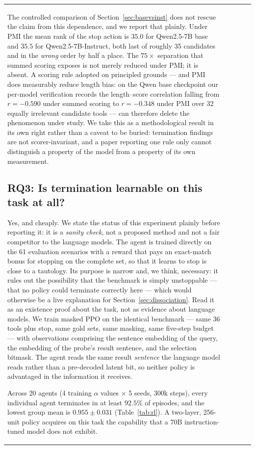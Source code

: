\documentclass[11pt]{article}
\begin{document}
\begin{table}[t]
\begin{tabular}{lcccc}
The controlled comparison of Section~\ref{sec:basevsinst} does not rescue the
claim from this dependence, and we report that plainly. Under PMI the mean rank of
the stop action is $35.0$ for Qwen2.5-7B base and $35.5$ for Qwen2.5-7B-Instruct,
both last of roughly 35 candidates and in the \emph{wrong} order by half a place.
The $75\times$ separation that summed scoring exposes is not merely reduced under
PMI; it is absent. A scoring rule adopted on principled grounds --- and PMI does
measurably reduce length bias: on the Qwen base checkpoint our per-model
verification records the length--score correlation falling from $r=-0.590$ under
summed scoring to $r=-0.348$ under PMI over 32 equally irrelevant candidate tools
--- can therefore delete the phenomenon under study. We take this as a methodological result in its own right rather than
a caveat to be buried: termination findings are not scorer-invariant, and a paper
reporting one rule only cannot distinguish a property of the model from a property
of its own measurement.

\subsection{RQ3: Is termination learnable on this task at all?}
\label{sec:rl}

Yes, and cheaply. We state the status of this experiment plainly before reporting
it: it is a \emph{sanity check}, not a proposed method and not a fair competitor
to the language models. The agent is trained directly on the 61 evaluation
scenarios with a reward that pays an exact-match bonus for stopping on the
complete set, so that it learns to stop is close to a tautology. Its purpose is
narrow and, we think, necessary: it rules out the possibility that the benchmark
is simply unstoppable --- that no policy could terminate correctly here --- which
would otherwise be a live explanation for Section~\ref{sec:dissociation}. Read it
as an existence proof about the task, not as evidence about language models. We train masked PPO on the identical benchmark --- same 36 tools
plus stop, same gold sets, same masking, same five-step budget --- with
observations comprising the sentence embedding of the query, the embedding of the
probe's result sentence, and the selection bitmask. The agent reads the same
result \emph{sentence} the language model reads rather than a pre-decoded latent
bit, so neither policy is advantaged in the information it receives.

Across 20 agents (4 training $\alpha$ values $\times$ 5 seeds, 300k steps), every
individual agent terminates in at least $92.5\%$ of episodes, and the lowest group
mean is $0.955 \pm 0.031$ (Table~\ref{tab:rl}). A two-layer, 256-unit policy
acquires on this task the capability that a 70B instruction-tuned model does not
exhibit.


\end{tabular}
\end{table}
\end{document}
